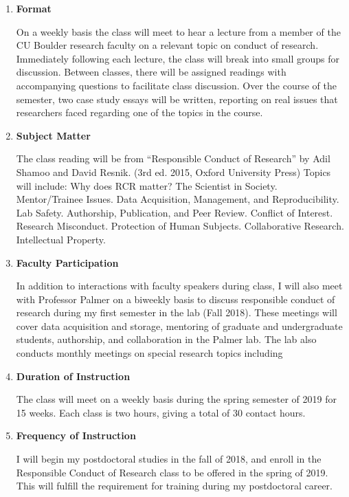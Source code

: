 \begin{enumerate}
  \item{\bf Format}

  On a weekly basis the class will meet to hear a lecture from a member of the CU Boulder research faculty on a relevant topic on conduct of research. Immediately following each lecture, the class will break into small groups for discussion. Between classes, there will be assigned readings with accompanying questions to facilitate class discussion. Over the course of the semester, two case study essays will be written, reporting on real issues that researchers faced regarding one of the topics in the course.
  \item{\bf Subject Matter}

  The class reading will be from ``Responsible Conduct of Research'' by Adil Shamoo and David Resnik. (3rd ed. 2015, Oxford University Press)
  Topics will include: Why does RCR matter? The Scientist in Society. Mentor/Trainee Issues. Data Acquisition, Management, and Reproducibility. Lab Safety. Authorship, Publication, and Peer Review. Conflict of Interest. Research Misconduct. Protection of Human Subjects. Collaborative Research. Intellectual Property.
  \item{\bf Faculty Participation}

  In addition to interactions with faculty speakers during class, I will also meet with Professor Palmer on a biweekly basis to discuss responsible conduct of research during my first semester in the lab (Fall 2018). These meetings will cover data acquisition and storage, mentoring of graduate and undergraduate students, authorship, and collaboration in the Palmer lab. The lab also conducts monthly meetings on special research topics including
  \item{\bf Duration of Instruction}

  The class will meet on a weekly basis during the spring semester of 2019 for 15 weeks. Each class is two hours, giving a total of 30 contact hours.
  \item{\bf Frequency of Instruction}

  I will begin my postdoctoral studies in the fall of 2018, and enroll in the Responsible Conduct of Research class to be offered in the spring of 2019. This will fulfill the requirement for training during my postdoctoral career.
\end{enumerate}

